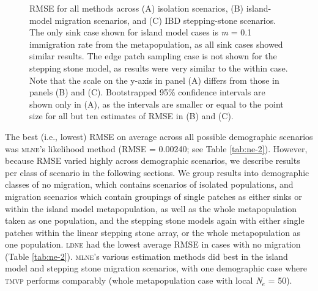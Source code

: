 \begin{figure}[]
\centering
{}
\caption{RMSE for all methods across (A) isolation scenarios, (B) island-model migration scenarios, and (C) 
IBD stepping-stone scenarios. The only sink case shown for island model cases is \emph{m} = 0.1 immigration rate from 
the metapopulation, as all sink cases showed similar results. The edge patch sampling case is not shown for 
the stepping stone model, as results were very similar to the within case. Note that the scale on the y-axis 
in panel (A) differs from those in panels (B) and (C). Bootstrapped 95\% confidence intervals are shown only 
in (A), as the intervals are smaller or equal to the point size for all but ten estimates of RMSE in (B) and (C).}
\label{fig:ne-2}
\end{figure}

The best (i.e., lowest) RMSE on average across all possible demographic scenarios was \textsc{mlne}'s 
likelihood method (RMSE = 0.00240; see Table \ref{tab:ne-2}). However, because RMSE varied highly across demographic 
scenarios, we describe results per class of scenario in the following sections. We group results 
into demographic classes of no migration, which contains scenarios of isolated populations, and 
migration scenarios which contain groupings of single patches as either sinks or within the island 
model metapopulation, as well as the whole metapopulation taken as one population, and the stepping 
stone models again with either single patches within the linear stepping stone array, or the whole 
metapopulation as one population. \textsc{ldne} had the lowest average RMSE in cases with no migration 
(Table \ref{tab:ne-2}). \textsc{mlne}'s various estimation methods did best in the island model and stepping stone 
migration scenarios, with one demographic case where \textsc{tmvp} performs comparably 
(whole metapopulation case with local \emph{N}$_e$ = 50).

